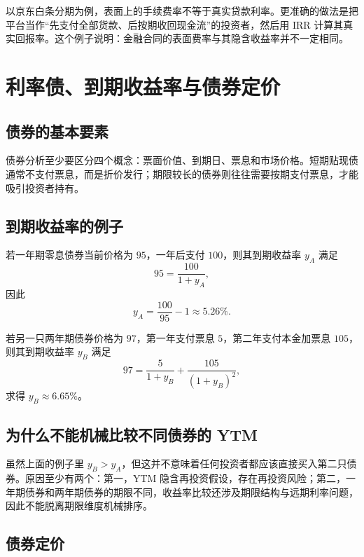 \documentclass[UTF8,11pt,a4paper]{ctexart}
\begin{document}
以京东白条分期为例，表面上的手续费率不等于真实贷款利率。更准确的做法是把平台当作“先支付全部货款、后按期收回现金流”的投资者，然后用 IRR 计算其真实回报率。这个例子说明：金融合同的表面费率与其隐含收益率并不一定相同。

\section{利率债、到期收益率与债券定价}

\subsection{债券的基本要素}

债券分析至少要区分四个概念：票面价值、到期日、票息和市场价格。短期贴现债通常不支付票息，而是折价发行；期限较长的债券则往往需要按期支付票息，才能吸引投资者持有。

\subsection{到期收益率的例子}

若一年期零息债券当前价格为 $95$，一年后支付 $100$，则其到期收益率 $y_A$ 满足
\begin{equation}
  95 = \frac{100}{1+y_A},
\end{equation}
因此
\begin{equation}
  y_A = \frac{100}{95} - 1 \approx 5.26\%.
\end{equation}

若另一只两年期债券价格为 $97$，第一年支付票息 $5$，第二年支付本金加票息 $105$，则其到期收益率 $y_B$ 满足
\begin{equation}
  97 = \frac{5}{1+y_B} + \frac{105}{(1+y_B)^2},
\end{equation}
求得 $y_B \approx 6.65\%$。

\subsection{为什么不能机械比较不同债券的 YTM}

虽然上面的例子里 $y_B > y_A$，但这并不意味着任何投资者都应该直接买入第二只债券。原因至少有两个：第一，YTM 隐含再投资假设，存在再投资风险；第二，一年期债券和两年期债券的期限不同，收益率比较还涉及期限结构与远期利率问题，因此不能脱离期限维度机械排序。

\subsection{债券定价}
\end{document}
